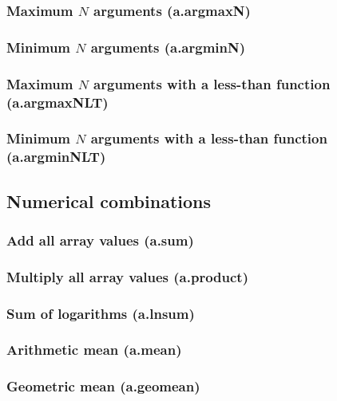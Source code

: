 \documentclass{article}
\theoremstyle{definition}
\begin{document}
\subsubsection{Maximum $N$ arguments (a.argmaxN)}

\subsubsection{Minimum $N$ arguments (a.argminN)}

\subsubsection{Maximum $N$ arguments with a less-than function (a.argmaxNLT)}

\subsubsection{Minimum $N$ arguments with a less-than function (a.argminNLT)}

\subsection{Numerical combinations}

\subsubsection{Add all array values (a.sum)}

\subsubsection{Multiply all array values (a.product)}

\subsubsection{Sum of logarithms (a.lnsum)}

\subsubsection{Arithmetic mean (a.mean)}

\subsubsection{Geometric mean (a.geomean)}
\end{document}
